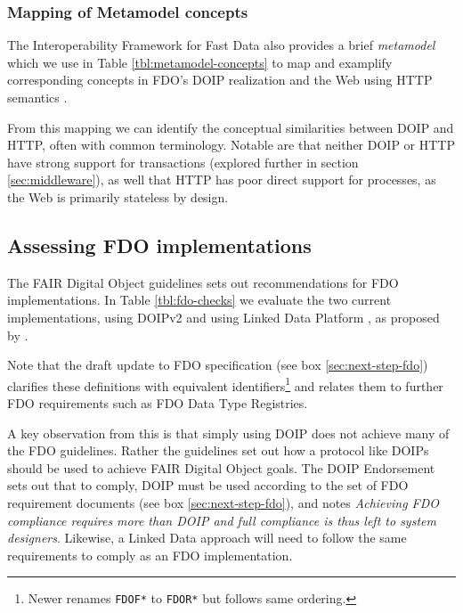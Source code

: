 \documentclass[fleqn,10pt,lineno]{wlpeerj}
\begin{document}
\hypertarget{mapping-of-metamodel-concepts}{%
\subsubsection*{Mapping of Metamodel concepts}\label{mapping-of-metamodel-concepts}}

The Interoperability Framework for Fast Data also provides a brief \emph{metamodel} which we use in Table \ref{tbl:metamodel-concepts} to map and examplify corresponding concepts in FDO's DOIP realization and the Web using HTTP semantics \cite{8HJqcF1Q}.



From this mapping we can identify the conceptual similarities between DOIP and HTTP, often with common terminology. Notable are that neither DOIP or HTTP have strong support for transactions (explored further in section \ref{sec:middleware}), as well that HTTP has poor direct support for processes, as the Web is primarily stateless by design.

\hypertarget{sec:doip-fdo-compare}{%
\subsection*{Assessing FDO implementations}\label{sec:doip-fdo-compare}}

The FAIR Digital Object guidelines \cite{RwvirqWg} sets out recommendations for FDO implementations. In Table \ref{tbl:fdo-checks} we evaluate the two current implementations, using DOIPv2 \cite{13TcbsZF6} and using Linked Data Platform \cite{17OHlMRQA}, as proposed by \cite{7szz7dwO}.



Note that the draft update to FDO specification \cite{yygVPoL0} (see box \ref{sec:next-step-fdo}) clarifies these definitions with equivalent identifiers\footnote{Newer \cite{yygVPoL0} renames \texttt{FDOF*} to \texttt{FDOR*} but follows same ordering.} and relates them to further FDO requirements such as FDO Data Type Registries.

A key observation from this is that simply using DOIP does not achieve many of the FDO guidelines. Rather the guidelines set out how a protocol like DOIPs should be used to achieve FAIR Digital Object goals. The DOIP Endorsement \cite{15yGpJ0wh} sets out that to comply, DOIP must be used according to the set of FDO requirement documents (see box \ref{sec:next-step-fdo}), and notes \emph{Achieving FDO compliance requires more than DOIP and full compliance is thus left to system designers}. Likewise, a Linked Data approach will need to follow the same requirements to comply as an FDO implementation.
\end{document}
